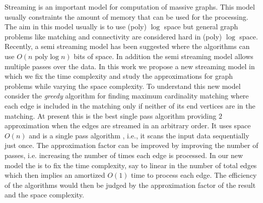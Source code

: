 \documentclass{scrartcl}
\begin{document}
Streaming is an important model for computation of massive graphs. This model usually constraints the amount of memory that can be used for the processing. The aim in this model usually is to use (poly) $\log$ space but general graph problems like matching and connectivity are considered hard in (poly) $\log$ space. Recently, a semi streaming model has been suggested where the algorithms can use $O(n \text{ poly} \log n)$ bits of space. In addition the semi streaming model allows multiple passes over the data.  In this work we propose a new streaming model in which we fix the time complexity and study the approximations for graph problems while varying the space complexity. 
To understand this new model consider the \emph{greedy} algorithm for finding maximum cardinality matching where each edge is included in the matching only if neither of its end vertices are in the matching. At present this is the best single pass algorithm providing $2$ approximation when the edges are streamed in an arbitrary order. It uses space $O(n)$ and is a single pass algorithm , i.e., it scans the input data sequentially just once. The approximation factor can be improved by improving the number of passes, i.e. increasing the number of times each edge is processed. In our new model the is to fix the time complexity, say to linear in the number of total edges which then implies an amortized $O(1)$ time to process each edge. The efficiency of the algorithms would then be judged by the approximation factor of the result and the space complexity.  



%
%
%
\end{document}
